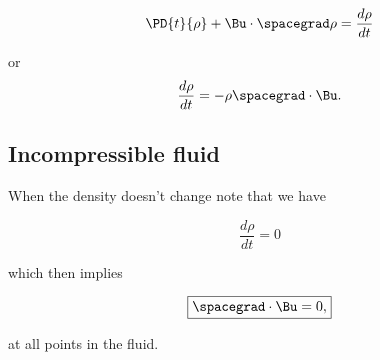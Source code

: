 \begin{equation}\label{eqn:continuumL9:510}
\PD{t}{\rho} + \Bu \cdot \spacegrad \rho = \frac{d\rho}{dt}
\end{equation}

or
\begin{equation}\label{eqn:continuumL9:530}
\frac{d\rho}{dt} = - \rho \spacegrad \cdot \Bu.
\end{equation}

\subsection{Incompressible fluid}

When the density doesn't change note that we have

\begin{equation}\label{eqn:continuumL9:550}
\frac{d\rho}{dt} = 0
\end{equation}

which then implies

\begin{equation}\label{eqn:continuumL9:570}
\boxed{
\spacegrad \cdot \Bu = 0,
}
\end{equation}

at all points in the fluid.


\EndArticle
